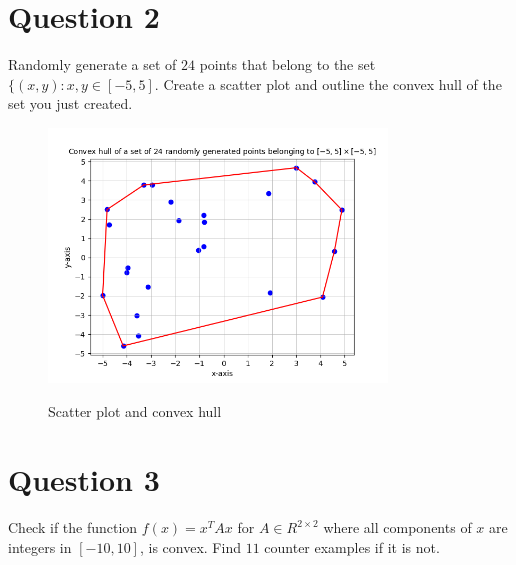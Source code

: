 \documentclass{article}
\begin{document}
\begin{flushleft}
 \section{Question 2}
 Randomly generate a set of $24$ points that belong to the set $\{(x,y):x,y\in[-5,5]$. Create a scatter plot and outline the convex hull of the set you just created.
 \begin{figure}[htp]
         \centering
         \includegraphics[width=9cm]{conv_hull.png}\\
         \caption{Scatter plot and convex hull}
 \end{figure}
 \section{Question 3}
 Check if the function $f(x)=x^{T}Ax$ for $A\in R^{2\times2}$ where all components of $x$ are integers in $[-10,10]$, is convex. Find $11$ counter examples if it is not.\\~\\


\end{flushleft}
\end{document}
